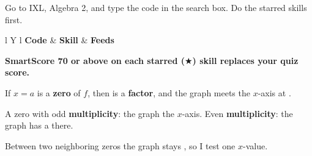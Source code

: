 Go to IXL, Algebra 2, and type the code in the search box. Do the starred skills first.\par\vspace{2pt}
\begin{tabularx}{\textwidth}{l Y l}
\toprule
\textbf{Code} & \textbf{Skill} & \textbf{Feeds} \\
\midrule
{}
\bottomrule
\end{tabularx}

\vspace{2pt}
\textbf{SmartScore 70 or above on each starred ($\bigstar$) skill replaces your quiz score.}

If $x=a$ is a \textbf{zero} of $f$, then \blank[2.5cm] is a \textbf{factor}, and the graph meets the $x$-axis at \blank[2cm].

A zero with odd \textbf{multiplicity}: the graph \blank[3cm] the $x$-axis. Even \textbf{multiplicity}: the graph has a \blank[3cm] there.

Between two neighboring zeros the graph stays \blank[4.5cm], so I test one $x$-value.


